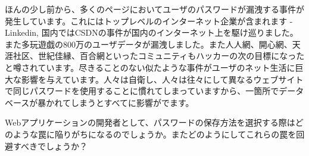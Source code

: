 ほんの少し前から、多くのページにおいてユーザのパスワードが漏洩する事件が発生しています。これにはトップレベルのインターネット企業が含まれます - Linkedin, 国内ではCSDNの事件が国内のインターネット上を駆け巡りました。また多玩遊戯の800万のユーザデータが漏洩しました。また人人網、開心網、天涯社区、世紀佳縁、百合網といったコミュニティもハッカーの次の目標になったと噂されています。尽きることのない似たような事件がユーザのネット生活に巨大な影響を与えています。人々は自衛し、人々は往々にして異なるウェブサイトで同じパスワードを使用することに慣れてしまっていますから、一箇所でデータベースが暴かれてしまうとすべてに影響がでます。

Webアプリケーションの開発者として、パスワードの保存方法を選択する際はどのような罠に陥りがちになるのでしょうか。またどのようにしてこれらの罠を回避すべきでしょうか？
